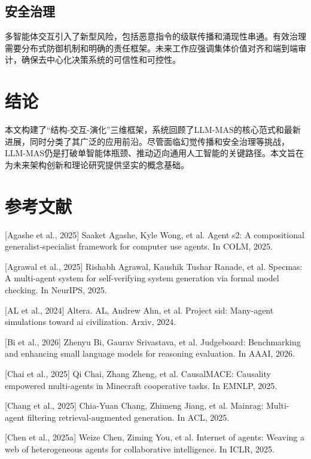 \documentclass[UTF8,a4paper,12pt]{article}
\begin{document}
\subsection{安全治理}

多智能体交互引入了新型风险，包括恶意指令的级联传播和涌现性串通。有效治理需要分布式防御机制和明确的责任框架。未来工作应强调集体价值对齐和端到端审计，确保去中心化决策系统的可信性和可控性。

\newpage
\section{结论}

本文构建了``结构-交互-演化''三维框架，系统回顾了LLM-MAS的核心范式和最新进展，同时分类了其广泛的应用前沿。尽管面临幻觉传播和安全治理等挑战，LLM-MAS仍是打破单智能体瓶颈、推动迈向通用人工智能的关键路径。本文旨在为未来架构创新和理论研究提供坚实的概念基础。

\newpage
\section*{参考文献}

\medskip
\small

{[}Agashe et al., 2025{]} Saaket Agashe, Kyle Wong, et al. Agent s2: A compositional generalist-specialist framework for computer use agents. In COLM, 2025.

{[}Agrawal et al., 2025{]} Rishabh Agrawal, Kaushik Tushar Ranade, et al. Specmas: A multi-agent system for self-verifying system generation via formal model checking. In NeurIPS, 2025.

{[}AL et al., 2024{]} Altera. AL, Andrew Ahn, et al. Project sid: Many-agent simulations toward ai civilization. Arxiv, 2024.

{[}Bi et al., 2026{]} Zhenyu Bi, Gaurav Srivastava, et al. Judgeboard: Benchmarking and enhancing small language models for reasoning evaluation. In AAAI, 2026.

{[}Chai et al., 2025{]} Qi Chai, Zhang Zheng, et al. CausalMACE: Causality empowered multi-agents in Minecraft cooperative tasks. In EMNLP, 2025.

{[}Chang et al., 2025{]} Chia-Yuan Chang, Zhimeng Jiang, et al. Mainrag: Multi-agent filtering retrieval-augmented generation. In ACL, 2025.

{[}Chen et al., 2025a{]} Weize Chen, Ziming You, et al. Internet of agents: Weaving a web of heterogeneous agents for collaborative intelligence. In ICLR, 2025.
\end{document}
